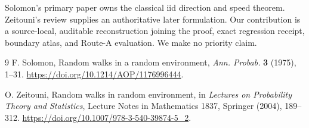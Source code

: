 \documentclass[10pt]{article}
\theoremstyle{remark}
\begin{document}
Solomon's primary paper \cite{Solomon1975} owns the classical iid direction
and speed theorem.  Zeitouni's review \cite{Zeitouni2004} supplies an
authoritative later formulation.  Our contribution is a source-local,
auditable reconstruction joining the proof, exact regression receipt, boundary
atlas, and Route-A evaluation.  We make no priority claim.

\begin{thebibliography}{9}
F. Solomon,
Random walks in a random environment,
\emph{Ann. Probab.} \textbf{3} (1975), 1--31.
\url{https://doi.org/10.1214/AOP/1176996444}.

O. Zeitouni,
Random walks in random environment,
in \emph{Lectures on Probability Theory and Statistics},
Lecture Notes in Mathematics 1837, Springer (2004), 189--312.
\url{https://doi.org/10.1007/978-3-540-39874-5_2}.
\end{thebibliography}
\end{document}
